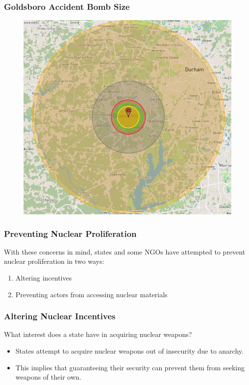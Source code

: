 \documentclass[handout]{beamer}
\begin{document}
\begin{frame} 
	\frametitle{\LARGE{Goldsboro Accident Bomb Size}}
	\begin{figure}
		\includegraphics[width=\textwidth,height=0.9\textheight,keepaspectratio]{1961accidentsize.png}
	\end{figure}
\end{frame}

\begin{frame} 
\frametitle{\LARGE{Preventing Nuclear Proliferation}}
With these concerns in mind, states and some NGOs have attempted to prevent nuclear proliferation in two ways: \pause
\begin{enumerate}
	\item Altering incentives
	\item Preventing actors from accessing nuclear materials
\end{enumerate}
\end{frame}

\begin{frame} 
\frametitle{\LARGE{Altering Nuclear Incentives}}
 What interest does a state have in acquiring nuclear weapons? \pause 
\begin{itemize}
		\item States attempt to acquire nuclear weapons out of insecurity due to anarchy. \pause
		\item This implies that guaranteeing their security can prevent them from seeking weapons of their own.
\end{itemize}
\end{frame}
\end{document}
